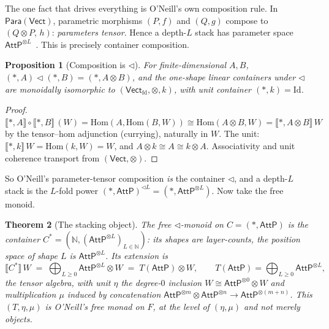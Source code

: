 \documentclass[11pt]{article}
\newcommand{\Vect}{\mathsf{Vect}}
\newcommand{\Para}{\mathsf{Para}}
\newcommand{\fld}{k}
\newcommand{\Hom}{\mathrm{Hom}}
\newcommand{\Id}{\mathrm{Id}}
\newcommand{\ext}[1]{\llbracket #1 \rrbracket}
\newcommand{\AttP}{\mathsf{AttP}}
\theoremstyle{plain}
\newtheorem{theorem}{Theorem}
\newtheorem{proposition}[theorem]{Proposition}
\theoremstyle{definition}
\begin{document}
The one fact that drives everything is O'Neill's own composition rule. In $\Para(\Vect)$, parametric
morphisms $(P,f)$ and $(Q,g)$ compose to $(Q\otimes P,\,h)$: \emph{parameters tensor}. Hence a depth-$L$
stack has parameter space $\AttP^{\otimes L}$~\cite[\S3]{oneill}. This is precisely container composition.

\begin{proposition}[Composition is $\lhd$]\label{prop:comp}
For finite-dimensional $A,B$, $(\ast,A)\lhd(\ast,B)=(\ast,A\otimes B)$, and the one-shape linear containers
under $\lhd$ are monoidally isomorphic to $(\Vect_{\mathrm{fd}},\otimes,\fld)$, with unit container
$(\ast,\fld)=\Id$.
\end{proposition}

\begin{proof}
$\ext{\ast,A}\circ\ext{\ast,B}\,(W)=\Hom(A,\Hom(B,W))\cong\Hom(A\otimes B,W)=\ext{\ast,A\otimes B}\,W$ by the
tensor--hom adjunction (currying), naturally in $W$. The unit: $\ext{\ast,\fld}\,W=\Hom(\fld,W)=W$, and
$A\otimes\fld\cong A\cong\fld\otimes A$. Associativity and unit coherence transport from $(\Vect,\otimes)$.
\end{proof}

So O'Neill's parameter-tensor composition \emph{is} the container $\lhd$, and a depth-$L$ stack is the
$L$-fold power $(\ast,\AttP)^{\lhd L}=(\ast,\AttP^{\otimes L})$. Now take the free monoid.

\begin{theorem}[The stacking object]\label{thm:stack}
The free $\lhd$-monoid on $C=(\ast,\AttP)$ is the container $C^{*}=(\mathbb{N},(\AttP^{\otimes L})_{L\in\mathbb{N}})$:
its shapes are layer-counts, the position space of shape $L$ is $\AttP^{\otimes L}$. Its extension is
\[
  \ext{C^{*}}\,W \;=\; \bigoplus_{L\ge 0}\AttP^{\otimes L}\otimes W \;=\; T(\AttP)\otimes W,
  \qquad T(\AttP)=\bigoplus_{L\ge 0}\AttP^{\otimes L},
\]
the tensor algebra, with unit $\eta$ the degree-$0$ inclusion $W\cong\AttP^{\otimes 0}\otimes W$ and
multiplication $\mu$ induced by concatenation $\AttP^{\otimes m}\otimes\AttP^{\otimes n}\to\AttP^{\otimes(m+n)}$.
This $(T,\eta,\mu)$ is O'Neill's free monad on $F$, at the level of $(\eta,\mu)$ and not merely objects.
\end{theorem}
\end{document}
